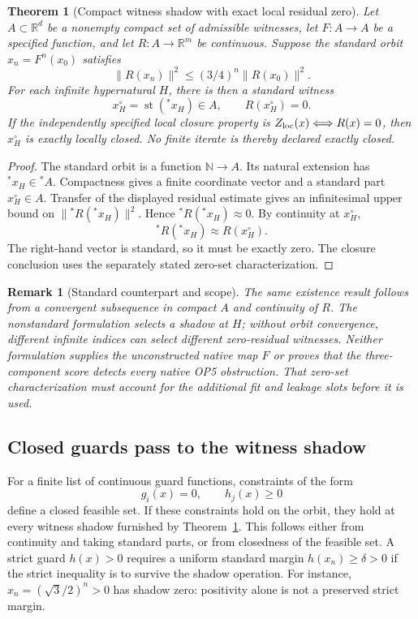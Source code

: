 \documentclass[11pt,a4paper]{article}
\newtheorem{theorem}{Theorem}
\newtheorem{remark}{Remark}
\begin{document}
\begin{theorem}[Compact witness shadow with exact local residual zero]
\label{thm:compact-witness-shadow}
Let $A\subset\mathbb R^d$ be a nonempty compact set of admissible witnesses,
let $F:A\to A$ be a specified function, and let $R:A\to\mathbb R^m$ be
continuous. Suppose the standard orbit $x_n=F^n(x_0)$ satisfies
\[
\|R(x_n)\|^2\le (3/4)^n\|R(x_0)\|^2.
\]
For each infinite hypernatural $H$, there is then a standard witness
\[
x_H^\circ=\operatorname{st}({}^*x_H)\in A,
\qquad R(x_H^\circ)=0.
\]
If the independently specified local closure property is
$Z_{\rm loc}(x)\Longleftrightarrow R(x)=0$, then $x_H^\circ$ is exactly
locally closed. No finite iterate is thereby declared exactly closed.
\end{theorem}
\begin{proof}
The standard orbit is a function $\mathbb N\to A$. Its natural extension
has ${}^*x_H\in{}^*A$. Compactness gives a finite coordinate vector and a
standard part $x_H^\circ\in A$. Transfer of the displayed residual estimate
gives an infinitesimal upper bound on $\|{}^*R({}^*x_H)\|^2$.
Hence ${}^*R({}^*x_H)\approx0$. By continuity at $x_H^\circ$,
\[
{}^*R({}^*x_H)\approx R(x_H^\circ).
\]
The right-hand vector is standard, so it must be exactly zero. The closure
conclusion uses the separately stated zero-set characterization.
\end{proof}

\begin{remark}[Standard counterpart and scope]
The same existence result follows from a convergent subsequence in compact
$A$ and continuity of $R$. The nonstandard formulation selects a shadow at
$H$; without orbit convergence, different infinite indices can select
different zero-residual witnesses. Neither formulation supplies the
unconstructed native map $F$ or proves that the three-component score
detects every native OP5 obstruction. That zero-set characterization must
account for the additional fit and leakage slots before it is used.
\end{remark}

\subsection{Closed guards pass to the witness shadow}
For a finite list of continuous guard functions, constraints of the form
\[
g_i(x)=0,\qquad h_j(x)\ge0
\]
define a closed feasible set. If these constraints hold on the orbit, they
hold at every witness shadow furnished by
Theorem~\ref{thm:compact-witness-shadow}. This follows either from continuity
and taking standard parts, or from closedness of the feasible set. A strict
guard $h(x)>0$ requires a uniform standard margin $h(x_n)\ge\delta>0$ if
the strict inequality is to survive the shadow operation.
For instance, $x_n=(\sqrt3/2)^n>0$ has shadow zero: positivity alone is
not a preserved strict margin.
\end{document}
